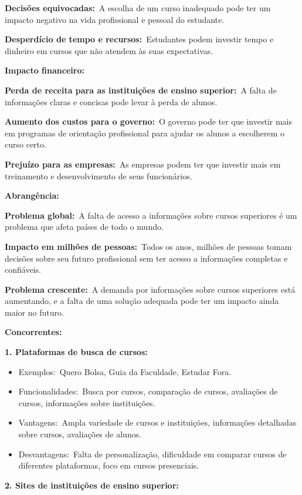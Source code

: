 \documentclass[a4paper]{article}
\begin{document}
\textbf{Decisões equivocadas:} A escolha de um curso inadequado pode ter um impacto negativo na vida profissional e
pessoal do estudante.

\textbf{Desperdício de tempo e recursos:} Estudantes podem investir tempo e dinheiro em cursos que não atendem às suas
expectativas.

\textbf{Impacto financeiro:}

\textbf{Perda de receita para as instituições de ensino superior:} A falta de informações claras e concisas pode levar à
perda de alunos.

\textbf{Aumento dos custos para o governo:} O governo pode ter que investir mais em programas de orientação profissional
para ajudar os alunos a escolherem o curso certo.

\textbf{Prejuízo para as empresas:} As empresas podem ter que investir mais em treinamento e desenvolvimento de seus
funcionários.

\textbf{Abrangência:}

\textbf{Problema global:} A falta de acesso a informações sobre cursos superiores é um problema que afeta países de todo
o mundo.

\textbf{Impacto em milhões de pessoas:} Todos os anos, milhões de pessoas tomam decisões sobre seu futuro profissional
sem ter acesso a informações completas e confiáveis.

\textbf{Problema crescente:} A demanda por informações sobre cursos superiores está aumentando, e a falta de uma solução
adequada pode ter um impacto ainda maior no futuro.


\bigskip


\bigskip


\bigskip

\textbf{Concorrentes:}

\textbf{1. Plataformas de busca de cursos:}

\begin{itemize}[series=listWWNumxii,label=[F0B7?]]
\item Exemplos: Quero Bolsa, Guia da Faculdade, Estudar Fora.
\item Funcionalidades: Busca por cursos, comparação de cursos, avaliações de cursos, informações sobre instituições.
\item Vantagens: Ampla variedade de cursos e instituições, informações detalhadas sobre cursos, avaliações de alunos.
\item Desvantagens: Falta de personalização, dificuldade em comparar cursos de diferentes plataformas, foco em cursos
presenciais.
\end{itemize}
\textbf{2. Sites de instituições de ensino superior:}
\end{document}
